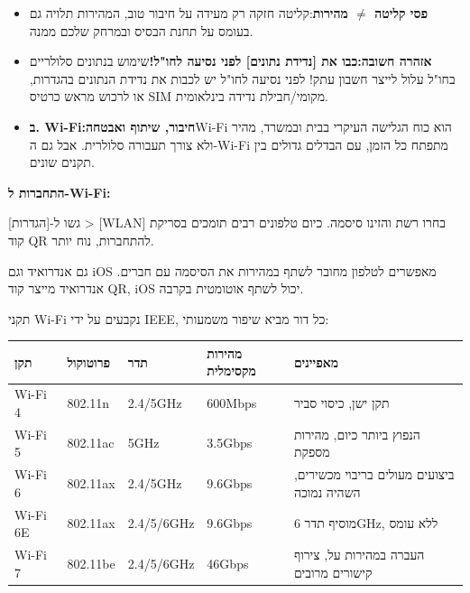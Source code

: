 
\begin{itemize}
  \item \textbf{פסי קליטה $\neq$ מהירות}:קליטה חזקה רק מעידה על חיבור טוב, המהירות תלויה גם בעומס על תחנת הבסיס ובמרחק שלכם ממנה.
  \item \textbf{אזהרה חשובה:כבו את [נדידת נתונים] לפני נסיעה לחו"ל!}שימוש בנתונים סלולריים בחו"ל עלול לייצר חשבון עתק! לפני נסיעה לחו"ל יש לכבות את נדידת הנתונים בהגדרות, או לרכוש מראש כרטיס SIM מקומי/חבילת נדידה בינלאומית.
  \item \textbf{ב. Wi-Fi:חיבור, שיתוף ואבטחה}Wi-Fi הוא כוח הגלישה העיקרי בבית ובמשרד, מהיר ולא צורך תעבורה סלולרית. אבל גם ה-Wi-Fi מתפתח כל הזמן, עם הבדלים גדולים בין תקנים שונים.
\end{itemize}

\textbf{התחברות ל-Wi-Fi:}\par

גשו ל-[הגדרות] > [WLAN] בחרו רשת והזינו סיסמה. כיום טלפונים רבים תומכים בסריקת קוד QR להתחברות, נוח יותר.


גם אנדרואיד וגם iOS מאפשרים לטלפון מחובר לשתף במהירות את הסיסמה עם חברים. אנדרואיד מייצר קוד QR, iOS יכול לשתף אוטומטית בקרבה.


תקני Wi-Fi נקבעים על ידי IEEE, כל דור מביא שיפור משמעותי:

\begin{center}
\begin{tabularx}{\linewidth}{|X|X|X|X|X|}
\hline
\textbf{תקן} & \textbf{פרוטוקול} & \textbf{תדר} & \textbf{מהירות מקסימלית} & \textbf{מאפיינים} \tabularnewline
\hline
Wi-Fi 4 & 802.11n & 2.4/5GHz & 600Mbps & תקן ישן, כיסוי סביר \tabularnewline
Wi-Fi 5 & 802.11ac & 5GHz & 3.5Gbps & הנפוץ ביותר כיום, מהירות מספקת \tabularnewline
Wi-Fi 6 & 802.11ax & 2.4/5GHz & 9.6Gbps & ביצועים מעולים בריבוי מכשירים, השהיה נמוכה \tabularnewline
Wi-Fi 6E & 802.11ax & 2.4/5/6GHz & 9.6Gbps & מוסיף תדר 6GHz, ללא עומס \tabularnewline
Wi-Fi 7 & 802.11be & 2.4/5/6GHz & 46Gbps & העברה במהירות על, צירוף קישורים מרובים \tabularnewline
\hline
\end{tabularx}
\end{center}


